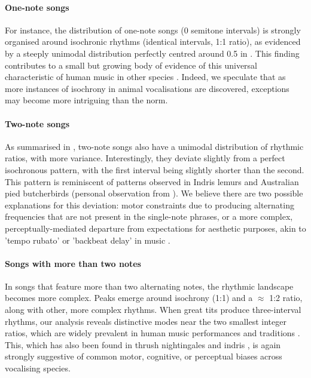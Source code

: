 \paragraph{One-note songs}
For instance, the distribution of one-note songs (0 semitone intervals) is strongly organised around isochronic rhythms (identical intervals, 1:1 ratio), as evidenced by a steeply unimodal distribution perfectly centred around 0.5 in . This finding contributes to a small but growing body of evidence of this universal characteristic of human music in other species \autocite{xing2022, rouse2021, roeske2020, demartsev2023, degregorio2021, degregorio2023, raimondi2023}. Indeed, we speculate that as more instances of isochrony in animal vocalisations are discovered, exceptions may become more intriguing than the norm.

\paragraph{Two-note songs}
As summarised in , two-note songs also have a unimodal distribution of rhythmic ratios, with more variance. Interestingly, they deviate slightly from a perfect isochronous pattern, with the first interval being slightly shorter than the second. This pattern is reminiscent of patterns observed in Indris lemurs \autocite{degregorio2021} and Australian pied butcherbirds (personal observation from \cite{xing2022}). We believe there are two possible explanations for this deviation: motor constraints due to producing alternating frequencies that are not present in the single-note phrases, or a more complex, perceptually-mediated departure from expectations for aesthetic purposes, akin to 'tempo rubato' \autocite{parncutt1994, degregorio2021} or 'backbeat delay' in music \autocite{frane2017}.

\paragraph{Songs with more than two notes}
In songs that feature more than two alternating notes, the rhythmic landscape becomes more complex. Peaks emerge around isochrony (1:1) and a $\approx$ 1:2 ratio, along with other, more complex rhythms. When great tits produce three-interval rhythms, our analysis reveals distinctive modes near the two smallest integer ratios, which are widely prevalent in human music performances and traditions \autocite{jacoby2017a, jacoby2021}. This, which has also been found in thrush nightingales and indris \autocite{roeske2020, degregorio2021}, is again strongly suggestive of common motor, cognitive, or perceptual biases across vocalising species.

